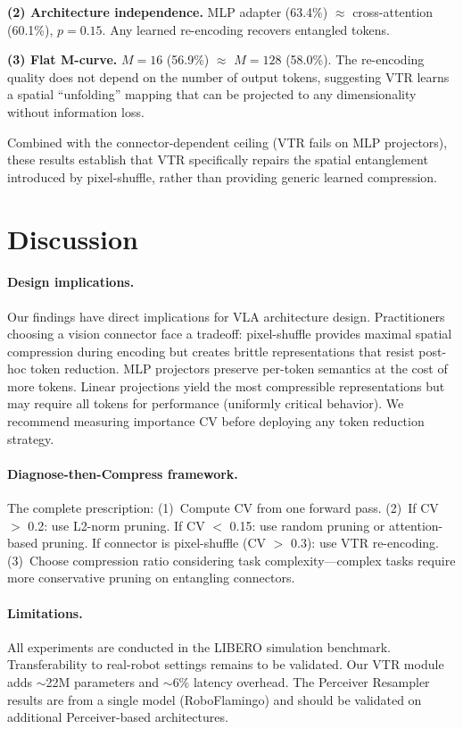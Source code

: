 \documentclass[10pt,letterpaper]{article}
\begin{document}
\textbf{(2) Architecture independence.} MLP adapter (63.4\%) $\approx$ cross-attention (60.1\%), $p\!=\!0.15$. Any learned re-encoding recovers entangled tokens.

\textbf{(3) Flat M-curve.} $M\!=\!16$ (56.9\%) $\approx$ $M\!=\!128$ (58.0\%). The re-encoding quality does not depend on the number of output tokens, suggesting VTR learns a spatial ``unfolding'' mapping that can be projected to any dimensionality without information loss.

Combined with the connector-dependent ceiling (VTR fails on MLP projectors), these results establish that VTR specifically repairs the spatial entanglement introduced by pixel-shuffle, rather than providing generic learned compression.


\section{Discussion}
\label{sec:discussion}

\paragraph{Design implications.}
Our findings have direct implications for VLA architecture design. Practitioners choosing a vision connector face a tradeoff: pixel-shuffle provides maximal spatial compression during encoding but creates brittle representations that resist post-hoc token reduction. MLP projectors preserve per-token semantics at the cost of more tokens. Linear projections yield the most compressible representations but may require all tokens for performance (uniformly critical behavior). We recommend measuring importance CV before deploying any token reduction strategy.

\paragraph{Diagnose-then-Compress framework.}
The complete prescription: (1)~Compute CV from one forward pass. (2)~If CV $>$ 0.2: use L2-norm pruning. If CV $<$ 0.15: use random pruning or attention-based pruning. If connector is pixel-shuffle (CV $>$ 0.3): use VTR re-encoding. (3)~Choose compression ratio considering task complexity---complex tasks require more conservative pruning on entangling connectors.

\paragraph{Limitations.}
All experiments are conducted in the LIBERO simulation benchmark. Transferability to real-robot settings remains to be validated. Our VTR module adds $\sim$22M parameters and $\sim$6\% latency overhead. The Perceiver Resampler results are from a single model (RoboFlamingo) and should be validated on additional Perceiver-based architectures.
\end{document}
